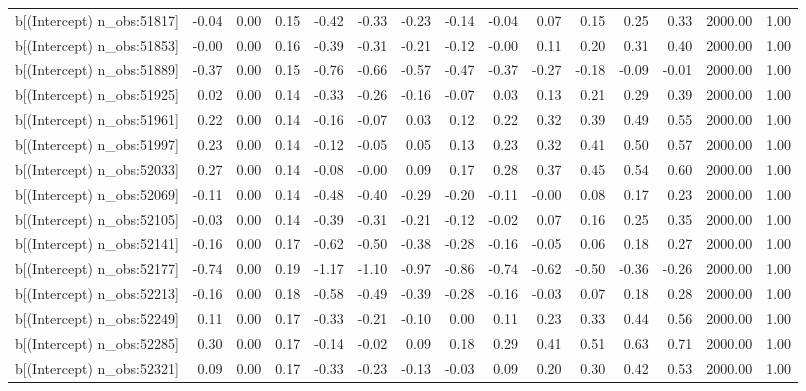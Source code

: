 \begin{table}[ht]
\begin{tabular}{rrrrrrrrrrrrrrr}
  b[(Intercept) n\_obs:51817] & -0.04 & 0.00 & 0.15 & -0.42 & -0.33 & -0.23 & -0.14 & -0.04 & 0.07 & 0.15 & 0.25 & 0.33 & 2000.00 & 1.00 \\ 
  b[(Intercept) n\_obs:51853] & -0.00 & 0.00 & 0.16 & -0.39 & -0.31 & -0.21 & -0.12 & -0.00 & 0.11 & 0.20 & 0.31 & 0.40 & 2000.00 & 1.00 \\ 
  b[(Intercept) n\_obs:51889] & -0.37 & 0.00 & 0.15 & -0.76 & -0.66 & -0.57 & -0.47 & -0.37 & -0.27 & -0.18 & -0.09 & -0.01 & 2000.00 & 1.00 \\ 
  b[(Intercept) n\_obs:51925] & 0.02 & 0.00 & 0.14 & -0.33 & -0.26 & -0.16 & -0.07 & 0.03 & 0.13 & 0.21 & 0.29 & 0.39 & 2000.00 & 1.00 \\ 
  b[(Intercept) n\_obs:51961] & 0.22 & 0.00 & 0.14 & -0.16 & -0.07 & 0.03 & 0.12 & 0.22 & 0.32 & 0.39 & 0.49 & 0.55 & 2000.00 & 1.00 \\ 
  b[(Intercept) n\_obs:51997] & 0.23 & 0.00 & 0.14 & -0.12 & -0.05 & 0.05 & 0.13 & 0.23 & 0.32 & 0.41 & 0.50 & 0.57 & 2000.00 & 1.00 \\ 
  b[(Intercept) n\_obs:52033] & 0.27 & 0.00 & 0.14 & -0.08 & -0.00 & 0.09 & 0.17 & 0.28 & 0.37 & 0.45 & 0.54 & 0.60 & 2000.00 & 1.00 \\ 
  b[(Intercept) n\_obs:52069] & -0.11 & 0.00 & 0.14 & -0.48 & -0.40 & -0.29 & -0.20 & -0.11 & -0.00 & 0.08 & 0.17 & 0.23 & 2000.00 & 1.00 \\ 
  b[(Intercept) n\_obs:52105] & -0.03 & 0.00 & 0.14 & -0.39 & -0.31 & -0.21 & -0.12 & -0.02 & 0.07 & 0.16 & 0.25 & 0.35 & 2000.00 & 1.00 \\ 
  b[(Intercept) n\_obs:52141] & -0.16 & 0.00 & 0.17 & -0.62 & -0.50 & -0.38 & -0.28 & -0.16 & -0.05 & 0.06 & 0.18 & 0.27 & 2000.00 & 1.00 \\ 
  b[(Intercept) n\_obs:52177] & -0.74 & 0.00 & 0.19 & -1.17 & -1.10 & -0.97 & -0.86 & -0.74 & -0.62 & -0.50 & -0.36 & -0.26 & 2000.00 & 1.00 \\ 
  b[(Intercept) n\_obs:52213] & -0.16 & 0.00 & 0.18 & -0.58 & -0.49 & -0.39 & -0.28 & -0.16 & -0.03 & 0.07 & 0.18 & 0.28 & 2000.00 & 1.00 \\ 
  b[(Intercept) n\_obs:52249] & 0.11 & 0.00 & 0.17 & -0.33 & -0.21 & -0.10 & 0.00 & 0.11 & 0.23 & 0.33 & 0.44 & 0.56 & 2000.00 & 1.00 \\ 
  b[(Intercept) n\_obs:52285] & 0.30 & 0.00 & 0.17 & -0.14 & -0.02 & 0.09 & 0.18 & 0.29 & 0.41 & 0.51 & 0.63 & 0.71 & 2000.00 & 1.00 \\ 
  b[(Intercept) n\_obs:52321] & 0.09 & 0.00 & 0.17 & -0.33 & -0.23 & -0.13 & -0.03 & 0.09 & 0.20 & 0.30 & 0.42 & 0.53 & 2000.00 & 1.00 \\ 

\end{tabular}
\end{table}
